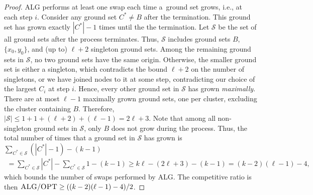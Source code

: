 \documentclass[a4paper,anonymous,USenglish]{lipics-v2019}
\newcommand{\OPT}{\textsc{OPT}\xspace}
\newcommand{\ALG}{\textsc{ALG}\xspace}
\begin{document}
\begin{proof}
	\ALG performs at least one swap each time a~ground set grows,
	i.e., at each step $i$.
	Consider any ground set $C^* \neq B$ after the termination.
	This ground set has grown exactly $|C^*|-1$ times until the the termination. 
	Let $\mathcal{S}$ be the set of all ground sets after the process terminates.
	Thus, $\mathcal{S}$ includes ground sets $B$,
	$\{x_0,y_0\}$,
	and (up to) $\ell+2$ singleton ground sets.
	Among the remaining ground sets in $\mathcal{S}$,
	no two ground sets have the same origin.
	Otherwise,
   the smaller ground set is either a singleton,
   which contradicts the bound $\ell+2$ on the number of singletons,
	or we have joined nodes to it at some step,
	contradicting our choice of the largest $C_i$ at step $i$.
	Hence, every  other ground set in
	$\mathcal{S}$ has grown \emph{maximally}.
	There are at most $\ell-1$ maximally grown ground sets,
	one per cluster,
	 excluding the cluster containing $B$. 
	Therefore,  $|\mathcal{S}| \leq 1 + 1 + (\ell+2)  + (\ell-1) = 2\ell+3$.
	Note that among all non-singleton ground sets in $\mathcal{S}$,
	 only $B$ does not grow during the process.
	 Thus,
    the total number of times that 
	a ground set in $\mathcal{S}$  has grown is
	$	\sum_{C^* \in \mathcal{S} } (|C^*|-1) - (k-1) $
	\begin{align*}
	=\sum_{C^* \in \mathcal{S} } |C^*| - 
		\sum_{C^* \in \mathcal{S} } 1 - (k-1) 
	\geq  k  \ell - (2\ell+3) - (k-1) =  (k-2)(\ell-1) - 4,
	\end{align*}
	which bounds the number of swaps performed by \ALG.
	The competitive ratio is then
	$\ALG / \OPT \geq ((k-2)(\ell-1) - 4) / 2$.

\end{proof}
\end{document}

